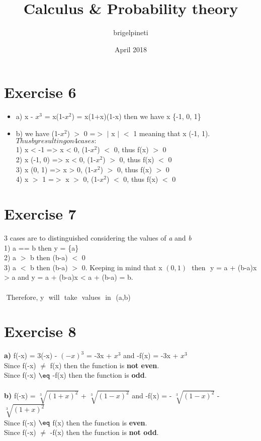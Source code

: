 \documentclass{article}
\title{Calculus & Probability theory}
\author{brigelpineti }
\date{April 2018}
\begin{document}
  \maketitle
  \section*{Exercise 6}
  \begin{itemize}
  
  \item a) x - $x^3$ = x(1-$x^2$) = x(1+x)(1-x) then we have x \in \{-1, 0, 1\} 
  
  \item b) we have (1-$x^2$) $>$ 0 =$>$ $\vert$ x $\vert$ $<$ 1 meaning that x \in (-1, 1). \\ 
  $Thus by resulting on 4 cases:$ \\
  1) x < -1 => x < 0, (1-$x^2$) $<$ 0, thus f(x) $>$ 0 \\
  2) x \in (-1, 0) => x < 0, (1-$x^2$) $>$ 0, thus f(x) $<$ 0 \\
  3) x \in (0, 1) => x > 0, (1-$x^2$) $>$ 0, thus f(x) $>$ 0 \\
  4) x $>$ 1 =$>$ x $>$ 0, (1-$x^2$) $<$ 0, thus f(x) $<$ 0
  \end{itemize}
  
  \section*{Exercise 7}
  
  3 cases are to distinguished considering the values of \textit{a} and \textit{b} \\
  1) a == b then y = \{a\} \\
  2) a $>$ b then (b-a) $<$ 0 \\
  3) a $<$ b then (b-a) $>$ 0. Keeping in mind that x \in $(0,1)$ $ $ then $ $ y = a + (b-a)x > a and y = a + (b-a)x < a + (b-a) = b.  $ $\\ \\
  $ $ Therefore, y $ $ will $ $ take $ $ values $ $ in $ $ (a,b) \\ 
  
  \section*{Exercise 8}
  
  \textbf{a)} f(-x) = 3(-x) - $(-x)^3$ = -3x + $x^3$ and -f(x) = -3x + $x^3$ \\
  Since f(-x) $\neq$ f(x) then the function is \textbf{not even}. \\
  Since f(-x) $\eq$ -f(x) then the function is \textbf{odd}. \\ \\
  \textbf{b)} f(-x) = $\sqrt[3]{(1+x)^2}$ + $\sqrt[3]{(1-x)^2}$ and -f(x) = - $\sqrt[3]{(1-x)^2}$ - $\sqrt[3]{(1+x)^2}$ \\
  Since f(-x) $\eq$ f(x) then the function is \textbf{even}. \\
  Since f(-x) $\neq$ -f(x) then the function is \textbf{not odd}.
  
\end{document}
